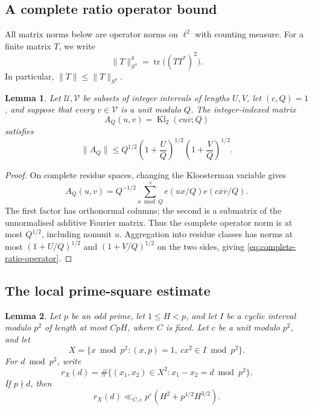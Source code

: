 \documentclass[12pt, a4paper]{amsart}
\numberwithin{equation}{section}
\newcommand{\e}{e}
\newcommand{\ep}{\varepsilon}
\renewcommand{\bar}[1]{\overline{#1}}
\renewcommand{\le}{\leqslant}
\theoremstyle{plain}
\newtheorem{lem}{Lemma}[section]
\begin{document}
\subsection{A complete ratio operator bound}
All matrix norms below are operator norms on $\ell^2$ with counting measure. For a finite matrix $T$, we write
$$
\|T\|_{S^4}^4=\operatorname{tr}\bigl((TT^*)^2\bigr).
$$
In particular, $\|T\|\le\|T\|_{S^4}$.
\begin{lem}\label{lem:complete-ratio-operator}
Let $\mathcal U,\mathcal V$ be subsets of integer intervals of lengths $U,V$, let $(c,Q)=1$, and suppose that every $v\in\mathcal V$ is a unit modulo $Q$. The integer-indexed matrix
$$
A_Q(u,v)=\operatorname{Kl}_2(cu\bar v;Q)
$$
satisfies
\begin{equation}\label{eq:complete-ratio-operator}
\|A_Q\|
\le Q^{1/2}
\left(1+\frac UQ\right)^{1/2}
\left(1+\frac VQ\right)^{1/2}.
\end{equation}
\end{lem}

\begin{proof}
On complete residue spaces, changing the Kloosterman variable gives
$$
A_Q(u,v)=Q^{-1/2}\sum_{x\bmod Q}^{\times}
\e(ux/Q)\e(c\bar x\bar v/Q).
$$
The first factor has orthonormal columns; the second is a submatrix of the unnormalised additive Fourier matrix. Thus the complete operator norm is at most $Q^{1/2}$, including nonunit $u$. Aggregation into residue classes has norms at most $(1+U/Q)^{1/2}$ and ${(1+V/Q)^{1/2}}$ on the two sides, giving \eqref{eq:complete-ratio-operator}.
\end{proof}

\subsection{The local prime-square estimate}

\begin{lem}\label{lem:p2-short-root-difference}
Let $p$ be an odd prime, let $1\le H<p$, and let $I$ be a cyclic interval modulo $p^2$ of length at most $CpH$, where $C$ is fixed. Let $c$ be a unit modulo $p^2$, and let
$$
X=\{x\bmod p^2:(x,p)=1,\ cx^2\in I\bmod {p^2}\}.
$$
For $d\bmod p^2$, write
$$
r_X(d)=\#\{(x_1,x_2)\in X^2:x_1-x_2=d\bmod {p^2}\}.
$$
If $p\nmid d$, then
\begin{equation}\label{eq:p2-short-root-difference}
r_X(d)\ll_{C,\ep}p^\ep
\left(H^2+p^{1/2}H^{3/2}\right).
\end{equation}
\end{lem}
\end{document}
